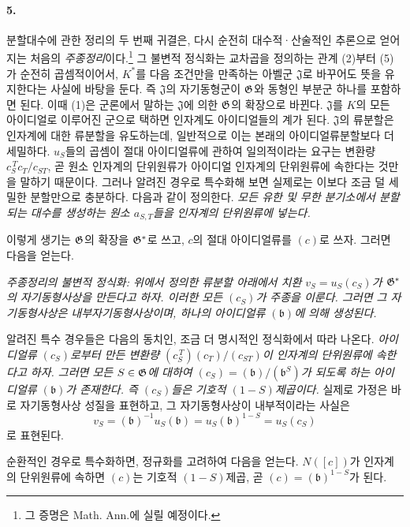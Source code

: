 \paragraph{5.}
분할대수에 관한 정리의 두 번째 귀결은, 다시 순전히 대수적·산술적인 추론으로 얻어지는 처음의 \emph{주종정리}이다.\footnote{그 증명은 Math. Ann.에 실릴 예정이다.} 그 불변적 정식화는 교차곱을 정의하는 관계 (2)부터 (5)가 순전히 곱셈적이어서, \(K^\ast\)를 다음 조건만을 만족하는 아벨군 \(\mathfrak J\)로 바꾸어도 뜻을 유지한다는 사실에 바탕을 둔다. 즉 \(\mathfrak J\)의 자기동형군이 \(\mathfrak G\)와 동형인 부분군 하나를 포함하면 된다. 이때 (1)은 군론에서 말하는 \glqq{}\(\mathfrak J\)에 의한 \(\mathfrak G\)의 확장\grqq{}으로 바뀐다. \(\mathfrak J\)를 \(K\)의 모든 아이디얼로 이루어진 군으로 택하면 인자계도 아이디얼들의 계가 된다. \(\mathfrak J\)의 류분할은 인자계에 대한 류분할을 유도하는데, 일반적으로 이는 본래의 아이디얼류분할보다 더 세밀하다. \(u_S\)들의 곱셈이 절대 아이디얼류에 관하여 일의적이라는 요구는 변환량 \(c_S^{\,T}c_T/c_{ST}\), 곧 원소 인자계의 단위원류가 아이디얼 인자계의 단위원류에 속한다는 것만을 말하기 때문이다. 그러나 알려진 경우로 특수화해 보면 실제로는 이보다 조금 덜 세밀한 분할만으로 충분하다. 다음과 같이 정의한다. \emph{모든 유한 및 무한 분기소에서 분할되는 대수를 생성하는 원소 \(a_{S,T}\)들을 인자계의 단위원류에 넣는다.}

이렇게 생기는 \(\mathfrak G\)의 확장을 \(\mathfrak G^\ast\)로 쓰고, \(c\)의 절대 아이디얼류를 \((c)\)로 쓰자. 그러면 다음을 얻는다.

\emph{주종정리의 불변적 정식화: 위에서 정의한 류분할 아래에서 치환 \(v_S=u_S(c_S)\)가 \(\mathfrak G^\ast\)의 자기동형사상을 만든다고 하자. 이러한 모든 \((c_S)\)가 주종을 이룬다. 그러면 그 자기동형사상은 내부자기동형사상이며, 하나의 아이디얼류 \((\mathfrak b)\)에 의해 생성된다.}

알려진 특수 경우들은 다음의 동치인, 조금 더 명시적인 정식화에서 따라 나온다. \emph{아이디얼류 \((c_S)\)로부터 만든 변환량 \((c_S^{\,T})(c_T)/(c_{ST})\)이 인자계의 단위원류에 속한다고 하자. 그러면 모든 \(S\in\mathfrak G\)에 대하여 \((c_S)=(\mathfrak b)/(\mathfrak b^S)\)가 되도록 하는 아이디얼류 \((\mathfrak b)\)가 존재한다. 즉 \((c_S)\)들은 기호적 \((1-S)\)제곱이다.} 실제로 가정은 바로 자기동형사상 성질을 표현하고, 그 자기동형사상이 내부적이라는 사실은
\[
v_S=(\mathfrak b)^{-1}u_S(\mathfrak b)
   =u_S(\mathfrak b)^{1-S}
   =u_S(c_S)
\]
로 표현된다.

순환적인 경우로 특수화하면, 정규화를 고려하여 다음을 얻는다. \(N([c])\)가 인자계의 단위원류에 속하면 \((c)\)는 기호적 \((1-S)\)제곱, 곧 \((c)=(\mathfrak b)^{1-S}\)가 된다.

